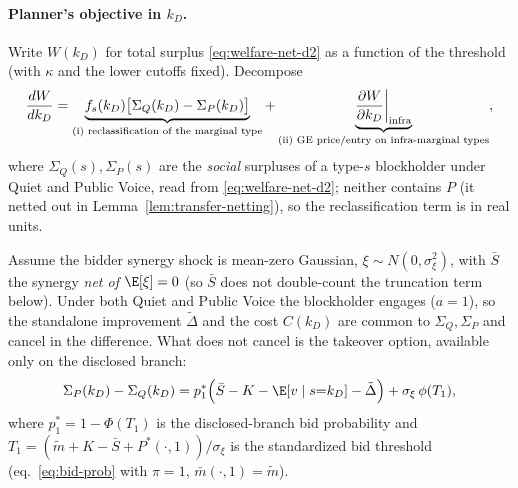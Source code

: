 \paragraph{Planner's objective in $k_D$.}
Write $W(k_D)$ for total surplus \eqref{eq:welfare-net-d2} as a function of the
threshold (with $\kappa$ and the lower cutoffs fixed). Decompose
\begin{equation}
\frac{dW}{dk_D}
 =\underbrace{f_s(k_D)\big[\Sigma_Q(k_D)-\Sigma_P(k_D)\big]}_{\text{(i) reclassification of the marginal type}}
 +\underbrace{\frac{\partial W}{\partial k_D}\bigg|_{\textup{infra}}}_{\text{(ii) GE price/entry on infra-marginal types}},
\label{eq:foc-planner-d2}
\end{equation}
where $\Sigma_Q(s),\Sigma_P(s)$ are the \emph{social} surpluses of a type-$s$
blockholder under Quiet and Public Voice, read from \eqref{eq:welfare-net-d2};
neither contains $P$ (it netted out in Lemma~\ref{lem:transfer-netting}), so the
reclassification term is in real units.

\begin{lemma}
\label{lem:reclass-jump}
Assume the bidder synergy shock is mean-zero Gaussian, $\xi\sim N(0,\sigma_\xi^2)$,
with $\bar S$ the synergy \emph{net of} $\E[\xi]=0$ (so $\bar S$ does not
double-count the truncation term below). Under both Quiet and Public Voice the
blockholder engages ($a=1$), so the standalone improvement $\tilde\Delta$ and the
cost $C(k_D)$ are common to $\Sigma_Q,\Sigma_P$ and cancel in the difference. What
does not cancel is the takeover option, available only on the disclosed branch:
\begin{equation}
\Sigma_P(k_D)-\Sigma_Q(k_D)
 =p_1^{\ast}\Big(\bar S-K-\E[v\mid s{=}k_D]-\tilde\Delta\Big)
   +\sigma_\xi\,\phi(T_1),
\label{eq:reclass-real}
\end{equation}
where $p_1^{\ast}=1-\Phi(T_1)$ is the disclosed-branch bid probability and
$T_1=(\tilde m+K-\bar S+P^{\ast}(\cdot,1))/\sigma_\xi$ is the standardized bid
threshold (eq.~\eqref{eq:bid-prob} with $\pi=1$, $\bar m(\cdot,1)=\tilde m$).
\end{lemma}

